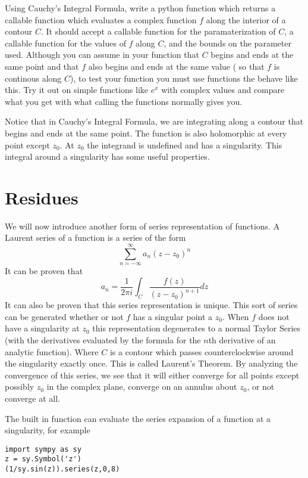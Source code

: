 \begin{problem}
Using Cauchy's Integral Formula, write a python function which returns a callable function which evaluates a complex function $f$ along the interior of a contour $C$. It should accept a callable function for the paramaterization of $C$, a callable function for the values of $f$ along $C$, and the bounds on the parameter used. Although you can assume in your function  that $C$ begins and ends at the same point and that $f$ also begins and ends at the same value ( so that $f$ is continous along $C$), to test your function you must use functions the behave like this. Try it out on simple functions like $e^x$ with complex values and compare what you get with what calling the functions normally gives you.
\end{problem}

Notice that in Cauchy's Integral Formula, we are integrating along a contour that begins and ends at the same point.
The function is also holomorphic at every point except $z_0$. At $z_0$ the integrand is undefined and has a singularity.
This integral around a singularity has some useful properties.

\section*{Residues}

We will now introduce another form of series representation of functions.
A Laurent series of a function is a series of the form $$\sum_{n= -\infty}^{\infty} a_n (z-z_0)^n$$
It can be proven that 
$$a_n = \frac{1}{2\pi i} \int_C \frac{f(z)}{(z-z_0)^{n+1}} dz$$ 
It can also be proven that this series representation is unique.
This sort of series can be generated whether or not $f$ has a singular point a $z_0$.
When $f$ does not have a singularity at $z_0$ this representation degenerates to a normal Taylor Series (with the derivatives evaluated by the formula for the $n$th derivative of an analytic function).
Where $C$ is a contour which passes counterclockwise around the singularity exactly once.
This is called Laurent's Theorem.
By analyzing the convergence of this series, we see that it will either converge for all points except possibly $z_0$ in the complex plane, converge on an annulus about $z_0$, or not converge at all.

The built in function  can evaluate the series expansion of a function at a singularity, for example
\begin{lstlisting}
import sympy as sy
z = sy.Symbol('z')
(1/sy.sin(z)).series(z,0,8)
\end{lstlisting}

